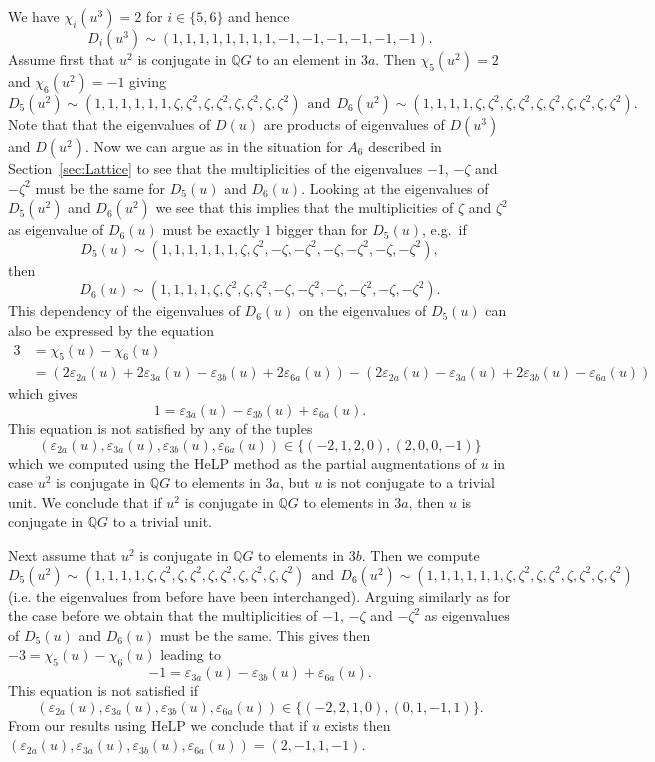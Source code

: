 \documentclass[10pt,a4paper,reqno]{amsart}
\theoremstyle{definition}
\theoremstyle{remark}
\newcommand{\QQ}{\mathbb{Q}}
\begin{document}
{We have $\chi_{i}(u^3) = 2$ for $i \in  \{5,6 \}$ and hence
$$D_{i}(u^3) \sim (1,1,1,1,1,1,1,1,-1,-1,-1,-1,-1,-1). $$
Assume first that $u^2$ is conjugate in $\QQ G$ to an element in $3a$. Then $\chi_{5}(u^2) = 2$ and $\chi_{6}(u^2) = -1$ giving
$$D_{5}(u^2) \sim (1,1,1,1,1,1,\zeta,\zeta^2,\zeta,\zeta^2,\zeta,\zeta^2,\zeta,\zeta^2) \ \ \text{and} \ \ D_{6}(u^2) \sim (1,1,1,1,\zeta,\zeta^2,\zeta,\zeta^2,\zeta,\zeta^2,\zeta,\zeta^2,\zeta,\zeta^2). $$
Note that that the eigenvalues of $D(u)$ are products of eigenvalues of $D(u^3)$ and $D(u^2)$.
Now we can argue as in the situation for $A_6$ described in Section~\ref{sec:Lattice} to see that the multiplicities of the eigenvalues $-1$, $-\zeta$ and $-\zeta^2$ must be the same for $D_{5}(u)$ and $D_{6}(u)$. Looking at the eigenvalues of $D_{5}(u^2)$ and $D_{6}(u^2)$ we see that this implies that the multiplicities of $\zeta$ and $\zeta^2$ as eigenvalue of $D_{6}(u)$ must be exactly $1$ bigger than for $D_{5}(u)$, e.g.\ if
$$D_{5}(u) \sim (1,1,1,1,1,1,\zeta,\zeta^2,-\zeta,-\zeta^2,-\zeta,-\zeta^2,-\zeta,-\zeta^2),$$
then
$$D_{6}(u) \sim (1,1,1,1,\zeta,\zeta^2,\zeta,\zeta^2,-\zeta,-\zeta^2,-\zeta,-\zeta^2,-\zeta,-\zeta^2).$$
This dependency of the eigenvalues of $D_{6}(u)$ on the eigenvalues of $D_{5}(u)$ can also be expressed by the equation 
\begin{align*}
3 &= \chi_{5}(u) - \chi_{6}(u) \\
 &= (2\varepsilon_{2a}(u) + 2\varepsilon_{3a}(u) - \varepsilon_{3b}(u) +2\varepsilon_{6a}(u)) - (2\varepsilon_{2a}(u) - \varepsilon_{3a}(u) + 2\varepsilon_{3b}(u) - \varepsilon_{6a}(u))  
\end{align*}
which gives
$$1 = \varepsilon_{3a}(u) - \varepsilon_{3b}(u) + \varepsilon_{6a}(u). $$
This equation is not satisfied by any of the tuples 
$$(\varepsilon_{2a}(u), \varepsilon_{3a}(u), \varepsilon_{3b}(u), \varepsilon_{6a}(u)) \in \{(-2,1,2,0), (2,0,0,-1) \}$$
which we computed using the HeLP method as the partial augmentations of $u$ in case $u^2$ is conjugate in $\QQ G$ to elements in $3a$, but $u$ is not conjugate to a trivial unit. We conclude that if $u^2$ is conjugate in $\QQ G$ to elements in $3a$, then $u$ is conjugate in $\QQ G$ to a trivial unit.

Next assume that $u^2$ is conjugate in $\QQ G$ to elements in $3b$. Then we compute  
$$D_{5}(u^2) \sim (1,1,1,1,\zeta,\zeta^2,\zeta,\zeta^2,\zeta,\zeta^2,\zeta,\zeta^2,\zeta,\zeta^2) \ \ \text{and} \ \ D_{6}(u^2) \sim (1,1,1,1,1,1,\zeta,\zeta^2,\zeta,\zeta^2,\zeta,\zeta^2,\zeta,\zeta^2) $$
(i.e. the eigenvalues from before have been interchanged). Arguing similarly as for the case before we obtain that the multiplicities of $-1$, $-\zeta$ and $-\zeta^2$ as eigenvalues of $D_{5}(u)$ and $D_{6}(u)$ must be the same. This gives then $-3 = \chi_{5}(u) - \chi_{6}(u)$ leading to
$$-1 = \varepsilon_{3a}(u) - \varepsilon_{3b}(u) + \varepsilon_{6a}(u). $$
This equation is not satisfied if 
$$(\varepsilon_{2a}(u), \varepsilon_{3a}(u), \varepsilon_{3b}(u), \varepsilon_{6a}(u)) \in \{(-2,2,1,0), (0,1,-1,1) \}.$$
From our results using HeLP we conclude that if $u$ exists then $(\varepsilon_{2a}(u), \varepsilon_{3a}(u), \varepsilon_{3b}(u), \varepsilon_{6a}(u)) =  (2,-1,1,-1)$.

}
\end{document}
